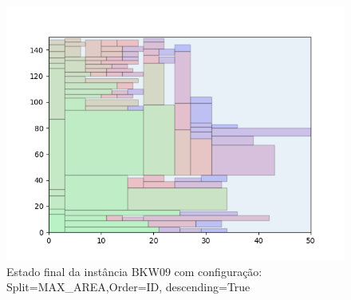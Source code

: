 \begin{figure}[H]
    \centering
    \caption[]{Estado final da instância BKW09 com configuração: Split=MAX_AREA,Order=ID, descending=True}
    \label{fig:bkw09-max_area-id-true}
    \includegraphics[scale=0.5]{output/figures/bkw/bkw09/max_area/id/true/000}
\end{figure}